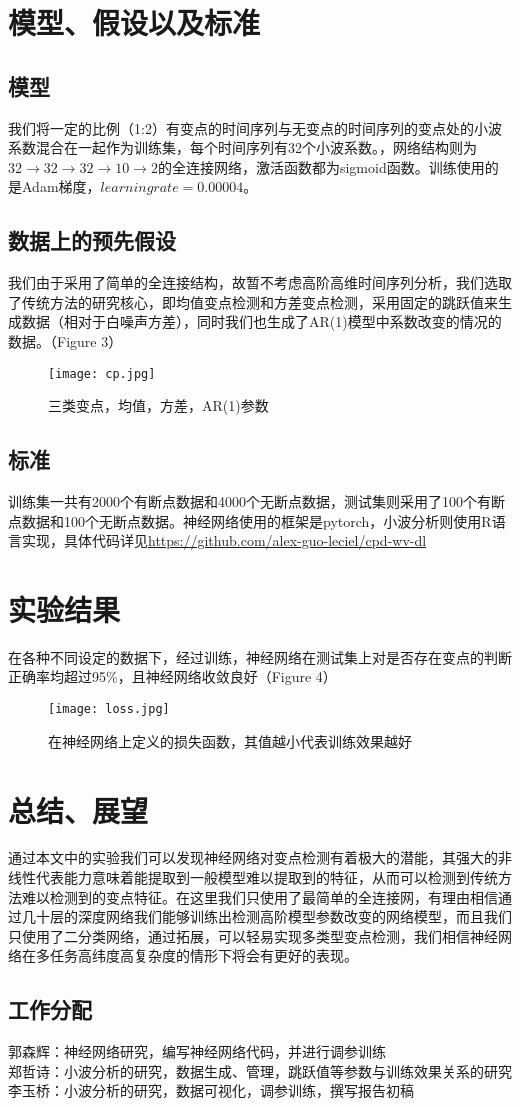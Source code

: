 \documentclass{ctexart}
\begin{document}
\section{模型、假设以及标准}
\subsection{模型}
我们将一定的比例（1:2）有变点的时间序列与无变点的时间序列的变点处的小波系数混合在一起作为训练集，每个时间序列有32个小波系数。，网络结构则为$32\longrightarrow32\longrightarrow32\longrightarrow10\longrightarrow2$的全连接网络，激活函数都为sigmoid函数。训练使用的是Adam梯度，$learning rate=0.00004$。
\subsection{数据上的预先假设}
我们由于采用了简单的全连接结构，故暂不考虑高阶高维时间序列分析，我们选取了传统方法的研究核心，即均值变点检测和方差变点检测，采用固定的跳跃值来生成数据（相对于白噪声方差），同时我们也生成了AR(1)模型中系数改变的情况的数据。（Figure 3）
\begin{figure}
\centering
\texttt{[image: cp.jpg]}
\caption{三类变点，均值，方差，AR(1)参数}
\end{figure}

\subsection{标准}
训练集一共有2000个有断点数据和4000个无断点数据，测试集则采用了100个有断点数据和100个无断点数据。神经网络使用的框架是pytorch，小波分析则使用R语言实现，具体代码详见\url{https://github.com/alex-guo-leciel/cpd-wv-dl}
\section{实验结果}
在各种不同设定的数据下，经过训练，神经网络在测试集上对是否存在变点的判断正确率均超过95\%，且神经网络收敛良好（Figure 4）

\begin{figure}
\centering
\texttt{[image: loss.jpg]}
\caption{在神经网络上定义的损失函数，其值越小代表训练效果越好}
\end{figure}

\section{总结、展望}
通过本文中的实验我们可以发现神经网络对变点检测有着极大的潜能，其强大的非线性代表能力意味着能提取到一般模型难以提取到的特征，从而可以检测到传统方法难以检测到的变点特征。在这里我们只使用了最简单的全连接网，有理由相信通过几十层的深度网络我们能够训练出检测高阶模型参数改变的网络模型，而且我们只使用了二分类网络，通过拓展，可以轻易实现多类型变点检测，我们相信神经网络在多任务高纬度高复杂度的情形下将会有更好的表现。
\subsection{工作分配}
\noindent 郭森辉：神经网络研究，编写神经网络代码，并进行调参训练\\
郑哲诗：小波分析的研究，数据生成、管理，跳跃值等参数与训练效果关系的研究\\
李玉桥：小波分析的研究，数据可视化，调参训练，撰写报告初稿
\end{document}
